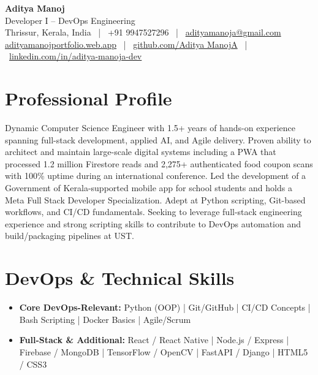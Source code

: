 \documentclass[10pt,a4paper]{article}
\begin{document}
\pagestyle{empty}
\color{textColor}

\begin{center}
    {\LARGE \bfseries \color{primaryColor} Aditya Manoj} \\
    \vspace{3pt}
    {\large Developer I -- DevOps Engineering} \\
    \vspace{3pt}
    \small
    Thrissur, Kerala, India \ | \ +91 9947527296 \ | \ \href{mailto:adityamanoja@gmail.com}{adityamanoja@gmail.com} \\
    \href{https://adityamanojportfolio.web.app}{adityamanojportfolio.web.app} \ | \ \href{https://github.com/AdityaManojA}{github.com/Aditya ManojA} \ | \ \href{https://linkedin.com/in/aditya-manoja-dev}{linkedin.com/in/aditya-manoja-dev}
\end{center}

\vspace{2pt}

\section*{Professional Profile}
Dynamic Computer Science Engineer with 1.5+ years of hands-on experience spanning full-stack development, applied AI, and Agile delivery. Proven ability to architect and maintain large-scale digital systems including a PWA that processed 1.2 million Firestore reads and 2,275+ authenticated food coupon scans with 100\% uptime during an international conference. Led the development of a Government of Kerala-supported mobile app for school students and holds a Meta Full Stack Developer Specialization. Adept at Python scripting, Git-based workflows, and CI/CD fundamentals. Seeking to leverage full-stack engineering experience and strong scripting skills to contribute to DevOps automation and build/packaging pipelines at UST.

\section*{DevOps \& Technical Skills}
\begin{itemize}[label={$\bullet$}]
    \item \textbf{Core DevOps-Relevant:} Python (OOP) | Git/GitHub | CI/CD Concepts | Bash Scripting | Docker Basics | Agile/Scrum
    \item \textbf{Full-Stack \& Additional:} React / React Native | Node.js / Express | Firebase / MongoDB | TensorFlow / OpenCV | FastAPI / Django | HTML5 / CSS3
\end{itemize}
\end{document}
